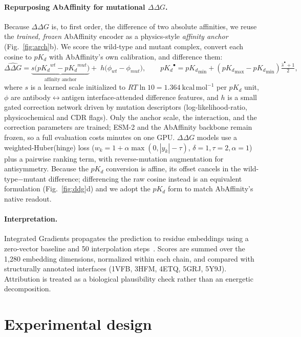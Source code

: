 \documentclass{article}
\newcommand{\ddg}{\ensuremath{\Delta\Delta G}}
\newcommand{\pkd}{\ensuremath{pK_d}}
\begin{document}
\paragraph{Repurposing AbAffinity for mutational \ddg{}.}
Because \ddg{} is, to first order, the difference of two absolute affinities, we reuse the \emph{trained, frozen} AbAffinity encoder as a physics-style \emph{affinity anchor} (Fig.~\ref{fig:arch}b). We score the wild-type and mutant complex, convert each cosine to \pkd{} with AbAffinity's own calibration, and difference them:
\begin{equation}
\widehat{\ddg}=\underbrace{s\big(\pkd^{wt}-\pkd^{mut}\big)}_{\text{affinity anchor}}
+\;h\big(\phi_{wt}-\phi_{mut}\big),\qquad
\pkd^{\bullet}={\pkd}_{\min}+({\pkd}_{\max}-{\pkd}_{\min})\tfrac{\hat s^{\bullet}+1}{2},
\label{eq:ddg}
\end{equation}
where $s$ is a learned scale initialized to $RT\ln 10=1.364\ \mathrm{kcal\,mol^{-1}}$ per \pkd{} unit, $\phi$ are antibody$\leftrightarrow$antigen interface-attended difference features, and $h$ is a small gated correction network driven by mutation descriptors (log-likelihood-ratio, physicochemical and CDR flags). Only the anchor scale, the interaction, and the correction parameters are trained; ESM-2 and the AbAffinity backbone remain frozen, so a full evaluation costs minutes on one GPU. \ddg{} models use a weighted-Huber(hinge) loss ($w_k=1+\alpha\max(0,|y_k|-\tau)$, $\delta{=}1,\tau{=}2,\alpha{=}1$) plus a pairwise ranking term, with reverse-mutation augmentation for antisymmetry. Because the \pkd{} conversion is affine, its offset cancels in the wild-type$-$mutant difference; differencing the raw cosine instead is an equivalent formulation (Fig.~\ref{fig:ddg}d) and we adopt the \pkd{} form to match AbAffinity's native readout.

\paragraph{Interpretation.}
Integrated Gradients propagates the prediction to residue embeddings using a zero-vector baseline and 50 interpolation steps~\citep{sundararajan2017axiomatic}. Scores are summed over the 1{,}280 embedding dimensions, normalized within each chain, and compared with structurally annotated interfaces (1VFB, 3HFM, 4ETQ, 5GRJ, 5Y9J). Attribution is treated as a biological plausibility check rather than an energetic decomposition.

\section{Experimental design}
\end{document}
